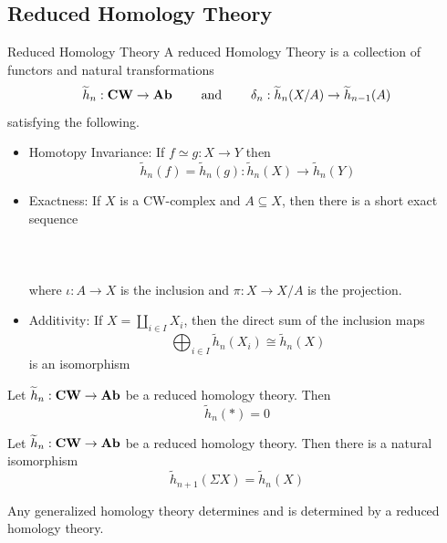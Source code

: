 \documentclass[a4paper]{article}
\begin{document}
\subsection{Reduced Homology Theory}
\begin{defn}{Reduced Homology Theory}{} A reduced Homology Theory is a collection of functors and natural transformations $$\widetilde{h}_n:\bold{CW}\to\bold{Ab}\;\;\;\;\;\;\;\text{ and }\;\;\;\;\;\;\;\delta_n:\widetilde{h}_n(X/A)\to\widetilde{h}_{n-1}(A)$$ satisfying the following. 
\begin{itemize}
\item Homotopy Invariance: If $f\simeq g:X\to Y$ then $$\widetilde{h}_n(f)=\widetilde{h}_n(g):\widetilde{h}_n(X)\to\widetilde{h}_n(Y)$$
\item Exactness: If $X$ is a CW-complex and $A\subseteq X$, then there is a short exact sequence \\~\\
\\~\\
where $\iota:A\to X$ is the inclusion and $\pi:X\to X/A$ is the projection. 
\item Additivity: If $X=\coprod_{i\in I}X_i$, then the direct sum of the inclusion maps $$\bigoplus_{i\in I}\widetilde{h}_n(X_i)\cong\widetilde{h}_n(X)$$ is an isomorphism
\end{itemize}
\end{defn}

\begin{lmm}{}{} Let $\widetilde{h}_n:\bold{CW}\to\bold{Ab}$ be a reduced homology theory. Then $$\widetilde{h}_n(\ast)=0$$
\end{lmm}

\begin{prp}{}{} Let $\widetilde{h}_n:\bold{CW}\to\bold{Ab}$ be a reduced homology theory. Then there is a natural isomorphism $$\widetilde{h}_{n+1}(\Sigma X)=\widetilde{h}_n(X)$$
\end{prp}

\begin{thm}{}{} Any generalized homology theory determines and is determined by a reduced homology theory.
\end{thm}
\end{document}
